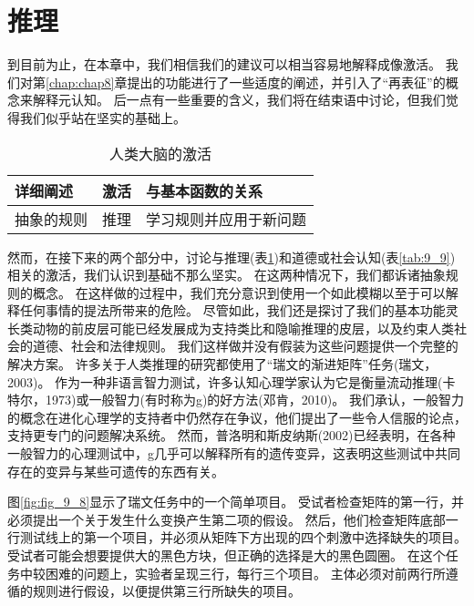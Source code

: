 \section{推理}

到目前为止，在本章中，我们相信我们的建议可以相当容易地解释成像激活。
我们对第\ref{chap:chap8}章提出的功能进行了一些适度的阐述，并引入了“再表征”的概念来解释元认知。
后一点有一些重要的含义，我们将在结束语中讨论，但我们觉得我们似乎站在坚实的基础上。



\par
\begin{table}[htbp] 
	\newcommand{\tabincell}[2]{\begin{tabular}{@{}#1@{}}#2\end{tabular}} %
	\centering
	\caption{人类大脑的激活\label{tab:9_8}}
	\renewcommand\arraystretch{1.5}	%
	\begin{tabular}{lll}
		\toprule
		详细阐述 & 激活 & 与基本函数的关系\\
		\midrule
		抽象的规则 & 推理 & 学习规则并应用于新问题  \\
		
		\bottomrule
		
	\end{tabular}%
\end{table}%


然而，在接下来的两个部分中，讨论与推理(表\ref{tab:9_8})和道德或社会认知(表\ref{tab:9_9})相关的激活，我们认识到基础不那么坚实。
在这两种情况下，我们都诉诸抽象规则的概念。
在这样做的过程中，我们充分意识到使用一个如此模糊以至于可以解释任何事情的提法所带来的危险。
尽管如此，我们还是探讨了我们的基本功能灵长类动物的前皮层可能已经发展成为支持类比和隐喻推理的皮层，以及约束人类社会的道德、社会和法律规则。
我们这样做并没有假装为这些问题提供一个完整的解决方案。
许多关于人类推理的研究都使用了“瑞文的渐进矩阵”任务(瑞文，2003)。
作为一种非语言智力测试，许多认知心理学家认为它是衡量流动推理(卡特尔，1973)或一般智力(有时称为g)的好方法(邓肯，2010)。
我们承认，一般智力的概念在进化心理学的支持者中仍然存在争议，他们提出了一些令人信服的论点，支持更专门的问题解决系统。
然而，普洛明和斯皮纳斯(2002)已经表明，在各种一般智力的心理测试中，g几乎可以解释所有的遗传变异，这表明这些测试中共同存在的变异与某些可遗传的东西有关。


图\ref{fig:fig_9_8}显示了瑞文任务中的一个简单项目。
受试者检查矩阵的第一行，并必须提出一个关于发生什么变换产生第二项的假设。
然后，他们检查矩阵底部一行测试线上的第一个项目，并必须从矩阵下方出现的四个刺激中选择缺失的项目。
受试者可能会想要提供大的黑色方块，但正确的选择是大的黑色圆圈。
在这个任务中较困难的问题上，实验者呈现三行，每行三个项目。
主体必须对前两行所遵循的规则进行假设，以便提供第三行所缺失的项目。




